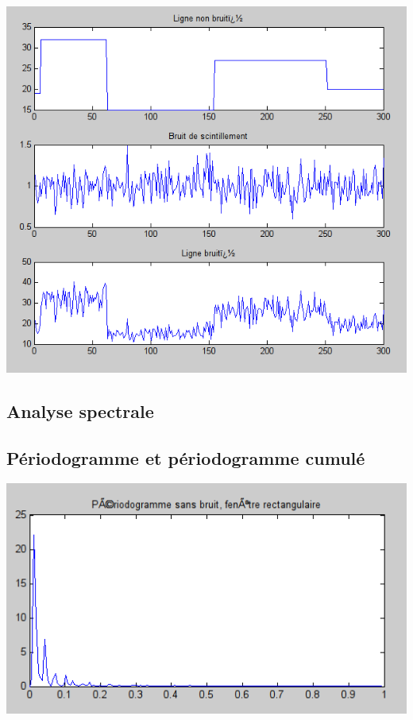 \documentclass{beamer}
\begin{document}
\begin{frame}
\begin{center}
\includegraphics[scale=0.4]{capture/D.png}
\end{center}
\end{frame}

\begin{frame}
\section{Analyse spectrale}
\subsection{Périodogramme et périodogramme cumulé}
\begin{center}
\includegraphics[scale=0.5]{capture/E.png}
\end{center}
\end{frame}
\end{document}
